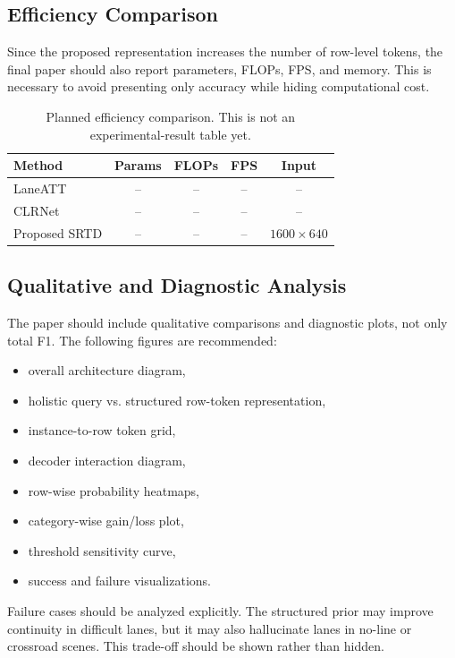 \documentclass[conference]{IEEEtran}
\newcommand{\method}{SRTD}
\begin{document}
\subsection{Efficiency Comparison}

Since the proposed representation increases the number of row-level tokens, the final paper should also report parameters, FLOPs, FPS, and memory. This is necessary to avoid presenting only accuracy while hiding computational cost.

\begin{table}[t]
\centering
\caption{Planned efficiency comparison. This is not an experimental-result table yet.}
\label{tab:efficiency}
\begin{tabular}{lcccc}
\toprule
Method & Params & FLOPs & FPS & Input \\
\midrule
LaneATT & -- & -- & -- & -- \\
CLRNet & -- & -- & -- & -- \\
Proposed \method & -- & -- & -- & $1600{\times}640$ \\
\bottomrule
\end{tabular}
\end{table}

\subsection{Qualitative and Diagnostic Analysis}

The paper should include qualitative comparisons and diagnostic plots, not only total F1. The following figures are recommended:

\begin{itemize}
    \item overall architecture diagram,
    \item holistic query vs. structured row-token representation,
    \item instance-to-row token grid,
    \item decoder interaction diagram,
    \item row-wise probability heatmaps,
    \item category-wise gain/loss plot,
    \item threshold sensitivity curve,
    \item success and failure visualizations.
\end{itemize}

Failure cases should be analyzed explicitly. The structured prior may improve continuity in difficult lanes, but it may also hallucinate lanes in no-line or crossroad scenes. This trade-off should be shown rather than hidden.
\end{document}
